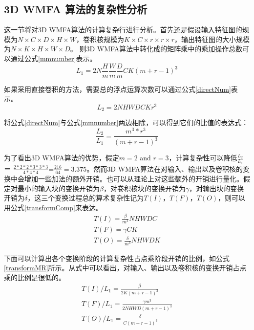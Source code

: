 \subsection{3D WMFA 算法的复杂性分析}
\label{Complexity}
这一节将对3D WMFA算法的计算复杂行进行分析。首先还是假设输入特征图的规模为$N \times C \times D \times H \times W$，卷积核规模为$K \times C \times r \times r \times r$，输出特征图的大小规模为$N \times K \times H \times W \times D$。 则3D WMFA算法中转化成的矩阵乘中的乘加操作总数可以通过公式\ref{mmnumber}表示。
\begin{equation}
\label{mmnumber}
L_1 = 2N{\frac{H}{m}}{\frac{W}{m}}{\frac{D}{m}}CK(m+r-1)^3
\end{equation}

如果采用直接卷积的方法，需要总的浮点运算次数可以通过公式\ref{directNum}表示。
\begin{equation}
\label{directNum}
L_2 = 2NHWDCKr^3
\end{equation}

将公式\ref{directNum}与公式\ref{mmnumber}两边相除，可以得到它们的比值的表达式：
\begin{equation}
\frac{L_2}{L_1} = \frac{m^3*r^3}{(m+r-1)^3}
\end{equation}

为了看出3D WMFA算法的优势，假定$m=2$ and $r=3$，计算复杂性可以降低$\frac{L_2}{L_1}$ ＝ $\frac{2*2*2*3*3*3}{4*4*4}$=$\frac{216}{64}=3.375$。然而3D WMFA算法在对输入、输出以及卷积核的变换中会增加一些加法的额外开销。也可以从理论上对这些额外的开销进行量化。假定对最小的输入块的变换开销为$\beta$，对卷积核块的变换开销为$\gamma$，对输出块的变换开销为$\delta$，这三个变换过程总的算术复杂性记为$T(I)$，$T(F)$，$T(O)$，则可以用公式\ref{transformComp}来表达。
\begin{equation}
\label{transformComp}
	\begin{split}
	T(I) = \frac{\beta}{m^3}NHWDC \\
	T(F) = \gamma CK \\
	T(O) = \frac{\delta}{m^3}NHWDK  
	\end{split}
\end{equation}

下面可以计算出各个变换阶段的计算复杂性占点乘阶段开销的比例，如公式\ref{transformMR}所示。从式中可以看出，对输入、输出以及卷积核的变换开销占点乘的比例是很低的。
\begin{equation}
\label{transformMR}
	\begin{split}
	T(I)/L_1 =\frac{\beta}{2K(m+r-1)^3}   \\
	T(F)/L_1 = \frac{\gamma m^3}{2NHWD(m+r-1)^3} \\
	T(O) /L_1= \frac{\delta}{C(m+r-1)^3} 
	\end{split}
\end{equation}

